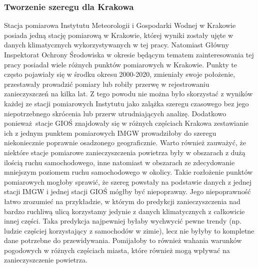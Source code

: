 \documentclass[10pt,a4paper]{article}
\begin{document}
\subsubsection{Tworzenie szeregu dla Krakowa}
Stacja pomiarowa Instytutu Meteorologii i Gospodarki Wodnej w Krakowie posiada jedną stację pomiarową w Krakowie, której wyniki zostały ujęte w danych klimatycznych wykorzystywanych w tej pracy. Natomiast Główny Inspektorat Ochrony Środowiska w okresie będącym tematem zainteresowania tej pracy posiadał wiele różnych punktów pomiarowych w Krakowie. Punkty te często pojawiały się w środku okresu 2000-2020, zmieniały swoje położenie, przestawały prowadzić pomiary lub robiły przerwę w rejestrowaniu zanieczyszczeń na kilka lat. Z tego powodu nie można było skorzystać z wyników każdej ze stacji pomiarowych Instytutu jako zalążka szeregu czasowego bez jego niepotrzebnego skrócenia lub przerw utrudniających analizę. Dodatkowo ponieważ stacje GIOŚ znajdowały się w różnych częściach Krakowa zestawianie ich z jednym punktem pomiarowych IMGW prowadziłoby do szeregu niekoniecznie poprawnie osadzonego geograficznie. Warto również zauważyć, że niektóre stacje pomiarowe zanieczyszczenia powietrza były w obszarach z dużą ilością ruchu samochodowego, inne natomiast w obszarach ze zdecydowanie mniejszym poziomem ruchu samochodowego w okolicy. Takie rozłożenie punktów pomiarowych mogłoby sprawić, że szereg powstały na podstawie danych z jednej stacji IMGW i jednej stacji GIOŚ mógłby być niepoprawny. Jego niepoprawność łatwo zrozumieć na przykładzie, w którym do predykcji zanieczyszczenia nad bardzo ruchliwą ulicą korzystamy jedynie z danych klimatycznych z całkowicie innej części. Taka predykcja najpewniej byłaby wychwycić pewne trendy (np. ludzie częściej korzystający z samochodów w zimie), lecz nie byłyby to kompletne dane potrzebne do przewidywania. Pomijałoby to również wahania warunków pogodowych w różnych częściach miasta, które również mogą wpływać na zanieczyszczenie powietrza.
\end{document}
